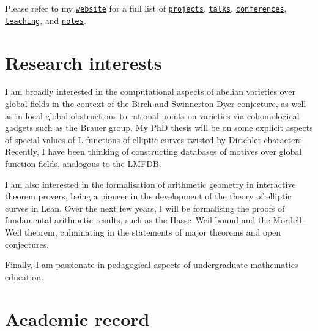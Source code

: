 \documentclass[10pt]{moderncv}
\begin{document}
\makecvtitle

\vspace{-0.5cm}

Please refer to my \href{https://multramate.github.io}{\texttt{website}} for a full list of \href{https://multramate.github.io/projects/}{\texttt{projects}}, \href{https://multramate.github.io/talks/}{\texttt{talks}}, \href{https://multramate.github.io/conferences/}{\texttt{conferences}}, \href{https://multramate.github.io/teaching/}{\texttt{teaching}}, and \href{https://multramate.github.io/notes/}{\texttt{notes}}.

\section{Research interests}

I am broadly interested in the computational aspects of abelian varieties over global fields in the context of the Birch and Swinnerton-Dyer conjecture, as well as in local-global obstructions to rational points on varieties via cohomological gadgets such as the Brauer group. My PhD thesis will be on some explicit aspects of special values of L-functions of elliptic curves twisted by Dirichlet characters. Recently, I have been thinking of constructing databases of motives over global function fields, analogous to the LMFDB.

\vspace{0.5cm}

I am also interested in the formalisation of arithmetic geometry in interactive theorem provers, being a pioneer in the development of the theory of elliptic curves in Lean. Over the next few years, I will be formalising the proofs of fundamental arithmetic results, such as the Hasse--Weil bound and the Mordell--Weil theorem, culminating in the statements of major theorems and open conjectures.

\vspace{0.5cm}

Finally, I am passionate in pedagogical aspects of undergraduate mathematics education.

\section{Academic record}

\vspace{-0.1cm}
\end{document}
